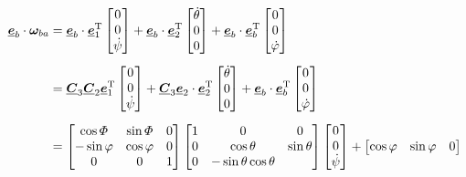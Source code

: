 \begin{align}
	\underline{\bm{e}}_b \cdot \bm{\omega}_{ba} &= \underline{\bm{e}}_b \cdot \underline{\bm{e}}_1^{\text{T}} 
	\begin{bmatrix}
		0 \\
		0 \\
		\dot{\psi}
	\end{bmatrix}
	+ \underline{\bm{e}}_b \cdot \underline{\bm{e}}_2^{\text{T}} 
	\begin{bmatrix}
		\dot{\theta} \\
		0 \\
		0
	\end{bmatrix}
	+ \underline{\bm{e}}_b \cdot \underline{\bm{e}}_b^{\text{T}} 
	\begin{bmatrix}
		0 \\
		0 \\
		\dot{\varphi}
	\end{bmatrix} \notag \\[0.5em]
	& = \underline{\bm{C}}_3 \underline{\bm{C}}_2 \underline{\bm{e}}_1^{\text{T}} 
	\begin{bmatrix}
		0 \\
		0 \\
		\dot{\psi}
	\end{bmatrix}
	+ \underline{\bm{C}}_3 \underline{\bm{e}}_2 \cdot \underline{\bm{e}}_2^{\text{T}} 
	\begin{bmatrix}
		\dot{\theta} \\
		0 \\
		0
	\end{bmatrix}
	+ \underline{\bm{e}}_b \cdot \underline{\bm{e}}_b^{\text{T}} 
	\begin{bmatrix}
		0 \\
		0 \\
		\dot{\varphi}
	\end{bmatrix} \notag \\[0.5em]
	&=
	\begin{bmatrix}
		\cos \varPhi & \sin \varPhi & 0 \\
		- \sin \varphi & \cos \varphi & 0 \\
		0 & 0 & 1
	\end{bmatrix}
	\begin{bmatrix}
		1 & 0 & 0 \\
		0 & \cos \theta & \sin \theta \\
		0 & - \sin \theta  \cos \theta 
	\end{bmatrix}
	\begin{bmatrix}
		0 \\
		0 \\
		\dot{\psi}
	\end{bmatrix}
	+
	\begin{bmatrix}
		\cos \varphi & \sin \varphi & 0 \\

\end{bmatrix}
\end{align}
